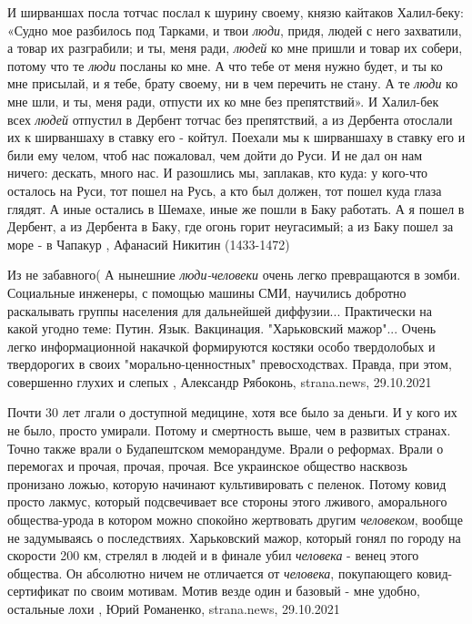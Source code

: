 И ширваншах посла тотчас послал к шурину своему, князю кайтаков Халил-беку:
«Судно мое разбилось под Тарками, и твои \emph{люди}, придя, людей с него захватили, а
товар их разграбили; и ты, меня ради, \emph{людей} ко мне пришли и товар их собери,
потому что те \emph{люди} посланы ко мне. А что тебе от меня нужно будет, и ты ко мне
присылай, и я тебе, брату своему, ни в чем перечить не стану. А те \emph{люди} ко мне
шли, и ты, меня ради, отпусти их ко мне без препятствий». И Халил-бек всех
\emph{людей} отпустил в Дербент тотчас без препятствий, а из Дербента отослали их к
ширваншаху в ставку его - койтул. Поехали мы к ширваншаху в ставку его и били
ему челом, чтоб нас пожаловал, чем дойти до Руси. И не дал он нам ничего:
дескать, много нас. И разошлись мы, заплакав, кто куда: у кого-что осталось на
Руси, тот пошел на Русь, а кто был должен, тот пошел куда глаза глядят. А иные
остались в Шемахе, иные же пошли в Баку работать. А я пошел в Дербент, а из
Дербента в Баку, где огонь горит неугасимый; а из Баку пошел за море - в
Чапакур
, Афанасий Никитин (1433-1472)

Из не забавного( А нынешние \emph{люди-человеки} очень легко превращаются в зомби.
Социальные инженеры, с помощью машины СМИ, научились добротно раскалывать
группы населения для дальнейшей диффузии... Практически на какой угодно теме:
Путин. Язык. Вакцинация. "Харьковский мажор"...  Очень легко информационной
накачкой формируются костяки особо твердолобых и твердорогих в своих
"морально-ценностных" превосходствах. Правда, при этом, совершенно глухих и
слепых
, 
Александр Рябоконь, strana.news, 29.10.2021

Почти 30 лет лгали о доступной медицине, хотя все было за деньги. И у кого их
не было, просто умирали. Потому и смертность выше, чем в развитых странах.
Точно также врали о Будапештском меморандуме. Врали о реформах. Врали о
перемогах и прочая, прочая, прочая. Все украинское общество насквозь пронизано
ложью, которую начинают культивировать с пеленок.  Потому ковид просто лакмус,
который подсвечивает все стороны этого лживого, аморального общества-урода в
котором можно спокойно жертвовать другим \emph{человеком}, вообще не задумываясь о
последствиях. Харьковский мажор, который гонял по городу на скорости 200 км,
стрелял в людей и в финале убил \emph{человека} - венец этого общества. Он абсолютно
ничем не отличается от \emph{человека}, покупающего ковид-сертификат по своим мотивам.
Мотив везде один и базовый - мне удобно, остальные лохи
, 
Юрий Романенко, strana.news, 29.10.2021

